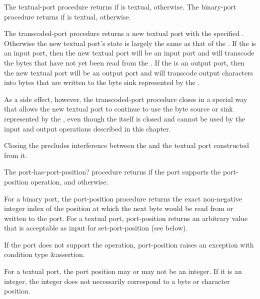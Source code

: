 \begin{entry}{%
}

The {\cf textual-port} procedure returns \schtrue{} if  is
textual, \schfalse otherwise.
The {\cf binary-port} procedure returns \schtrue{} if  is
textual, \schfalse otherwise.
\end{entry}

\begin{entry}{%
}

The {\cf transcoded-port} procedure
returns a new textual port with the specified .
Otherwise the new textual port's state is largely the same as
that of the .
If the  is an input port, then the new textual
port will be an input port and
will transcode the bytes that have not yet been read from
the .
If the  is an output port, then the new textual
port will be an output port and
will transcode output characters into bytes that are
written to the byte sink represented by the .

As a side effect, however, the {\cf transcoded-port} procedure
closes  in
a special way that allows the new textual port to continue to
use the byte source or sink represented by the ,
even though the  itself is closed and cannot
be used by the input and output operations described in this
chapter.

\begin{rationale}
Closing the  precludes interference between
the  and the textual port constructed from it.
\end{rationale}
\end{entry}

\begin{entry}{%
}

The {\cf port-has-port-position?} procedure returns \schtrue{} if the
port supports the {\cf port-position} operation, and \schfalse{}
otherwise.

For a binary port, the {\cf port-position} procedure returns the exact
non-negative integer index of the position at which the next byte
would be read from or written to the port.  For a textual port, {\cf
  port-position} returns an arbitrary value that is acceptable as
input for {\cf set-port-position} (see below).

If the port does not support the operation, {\cf port-position} raises
an exception with condition type {\cf\&assertion}.

\begin{note}
  For a textual port, the port position may or may not be an integer.
  If it is an integer, the integer does not necessarily correspond to
  a byte or character position.
\end{note}
\end{entry}   

